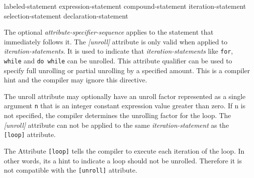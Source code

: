 \begin{grammar}
    \br
    labeled-statement\br
     expression-statement\br
     compound-statement\br
     iteration-statement\br
     selection-statement\br
    declaration-statement
\end{grammar}
\p The optional \textit{attribute-specifier-sequence} applies to the statement 
that immediately follows it.
\p The \textit{[unroll]}  attribute is only valid when applied to 
\textit{iteration-statements}. It is used to indicate that 
\textit{iteration-statements} like \texttt{for}, \texttt{while} and 
\texttt{do while} can be unrolled. This attribute qualifier can be used to 
specify full unrolling or partial unrolling by a specified amount. This is a 
compiler hint  and the compiler may ignore this directive.

\p The unroll attribute may optionally have an unroll factor represented as a 
single argument \texttt{n}  that is an integer constant expression value 
greater than zero. If n is not  specified, the compiler determines the 
unrolling factor for the loop. The \textit{[unroll]}  attribute can not be 
applied to the same \textit{iteration-statement} as the \texttt{[loop]} 
attribute.

\p The Attribute \texttt{[loop]} tells the compiler to execute each iteration 
of the loop. In other words, its a hint to indicate a loop should not be 
unrolled. Therefore it is not compatible with the \texttt{[unroll]} attribute.

